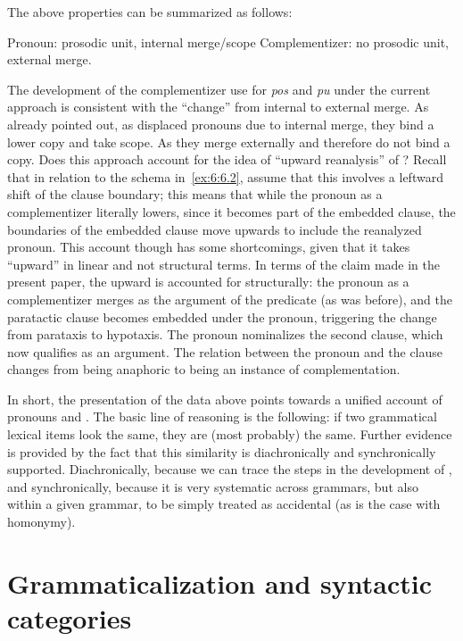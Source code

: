 \documentclass[output=paper]{langsci/langscibook}
\begin{document}
The above properties can be summarized as follows:

\ea\label{ex:6:6.13}
	\ea Pronoun: prosodic unit, internal merge/scope
	\ex Complementizer: no prosodic unit, external merge.
	\z
\z

The development of the complementizer use for \emph{pos}
and \emph{pu} under the current approach is consistent with the
\enquote{change} from internal to external merge. As already pointed out, as
displaced pronouns due to internal merge, they bind a lower copy and take
scope. As  they merge externally and therefore do not bind
a copy.  Does this approach account for the idea of \enquote{upward reanalysis}
of \citet{RobRou2003}? Recall that in relation to the schema
in~\eqref{ex:6:6.2}, \citeauthor{RobRou2003} assume that this involves a
leftward shift of the clause boundary; this means that while the pronoun as a
complementizer literally lowers, since it becomes part of the embedded clause,
the boundaries of the embedded clause move upwards to include the reanalyzed
pronoun. This account though has some shortcomings, given that it takes
\enquote{upward} in linear and not structural terms. In terms of the claim made
in the present paper, the upward  is accounted for
structurally: the pronoun as a complementizer merges as the
argument of the predicate (as was before), and the paratactic clause becomes
embedded under the pronoun, triggering the change from parataxis to hypotaxis.
The pronoun nominalizes the second clause, which now qualifies as an argument.
The relation between the pronoun and the clause changes from being anaphoric to
being an instance of complementation.

In short, the presentation of the data above points towards a unified account
of pronouns and . The basic line of reasoning is the following:
if two grammatical lexical items look the same, they are (most probably) the
same. Further evidence is provided by the fact that this similarity is
diachronically and synchronically supported. Diachronically, because we can
trace the steps in the development of , and synchronically,
because it is very systematic across grammars, but also within a given grammar,
to be simply treated as accidental (as is the case with homonymy).

\section{Grammaticalization and syntactic categories}\label{sec:gram-cat}
\end{document}
